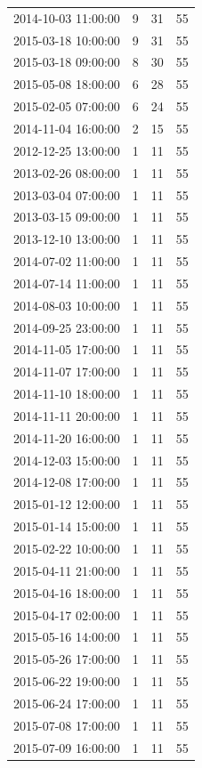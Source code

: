 \begin{tabular}{lrrr}
2014-10-03 11:00:00 & 9 & 31 & 55 \\
2015-03-18 10:00:00 & 9 & 31 & 55 \\
2015-03-18 09:00:00 & 8 & 30 & 55 \\
2015-05-08 18:00:00 & 6 & 28 & 55 \\
2015-02-05 07:00:00 & 6 & 24 & 55 \\
2014-11-04 16:00:00 & 2 & 15 & 55 \\
2012-12-25 13:00:00 & 1 & 11 & 55 \\
2013-02-26 08:00:00 & 1 & 11 & 55 \\
2013-03-04 07:00:00 & 1 & 11 & 55 \\
2013-03-15 09:00:00 & 1 & 11 & 55 \\
2013-12-10 13:00:00 & 1 & 11 & 55 \\
2014-07-02 11:00:00 & 1 & 11 & 55 \\
2014-07-14 11:00:00 & 1 & 11 & 55 \\
2014-08-03 10:00:00 & 1 & 11 & 55 \\
2014-09-25 23:00:00 & 1 & 11 & 55 \\
2014-11-05 17:00:00 & 1 & 11 & 55 \\
2014-11-07 17:00:00 & 1 & 11 & 55 \\
2014-11-10 18:00:00 & 1 & 11 & 55 \\
2014-11-11 20:00:00 & 1 & 11 & 55 \\
2014-11-20 16:00:00 & 1 & 11 & 55 \\
2014-12-03 15:00:00 & 1 & 11 & 55 \\
2014-12-08 17:00:00 & 1 & 11 & 55 \\
2015-01-12 12:00:00 & 1 & 11 & 55 \\
2015-01-14 15:00:00 & 1 & 11 & 55 \\
2015-02-22 10:00:00 & 1 & 11 & 55 \\
2015-04-11 21:00:00 & 1 & 11 & 55 \\
2015-04-16 18:00:00 & 1 & 11 & 55 \\
2015-04-17 02:00:00 & 1 & 11 & 55 \\
2015-05-16 14:00:00 & 1 & 11 & 55 \\
2015-05-26 17:00:00 & 1 & 11 & 55 \\
2015-06-22 19:00:00 & 1 & 11 & 55 \\
2015-06-24 17:00:00 & 1 & 11 & 55 \\
2015-07-08 17:00:00 & 1 & 11 & 55 \\
2015-07-09 16:00:00 & 1 & 11 & 55 \\

\end{tabular}
